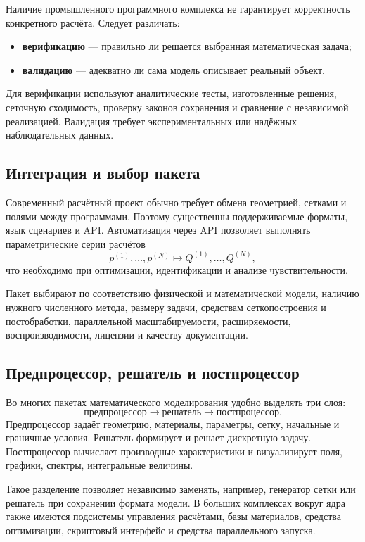Наличие промышленного программного комплекса не гарантирует корректность конкретного расчёта. Следует различать:
\begin{itemize}
\item \textbf{верификацию} --- правильно ли решается выбранная математическая задача;
\item \textbf{валидацию} --- адекватно ли сама модель описывает реальный объект.
\end{itemize}

Для верификации используют аналитические тесты, изготовленные решения, сеточную сходимость, проверку законов сохранения и сравнение с независимой реализацией. Валидация требует экспериментальных или надёжных наблюдательных данных.

\subsection{Интеграция и выбор пакета}

Современный расчётный проект обычно требует обмена геометрией, сетками и полями между программами. Поэтому существенны поддерживаемые форматы, язык сценариев и API. Автоматизация через API позволяет выполнять параметрические серии расчётов
\[
p^{(1)},\ldots,p^{(N)}
\longmapsto
Q^{(1)},\ldots,Q^{(N)},
\]
что необходимо при оптимизации, идентификации и анализе чувствительности.

Пакет выбирают по соответствию физической и математической модели, наличию нужного численного метода, размеру задачи, средствам сеткопостроения и постобработки, параллельной масштабируемости, расширяемости, воспроизводимости, лицензии и качеству документации.


\subsection{Предпроцессор, решатель и постпроцессор}

Во многих пакетах математического моделирования удобно выделять три слоя:
\[
\boxed{\text{предпроцессор}\rightarrow\text{решатель}\rightarrow\text{постпроцессор}}.
\]
Предпроцессор задаёт геометрию, материалы, параметры, сетку, начальные и
граничные условия. Решатель формирует и решает дискретную задачу. Постпроцессор
вычисляет производные характеристики и визуализирует поля, графики, спектры,
интегральные величины.

Такое разделение позволяет независимо заменять, например, генератор сетки или
решатель при сохранении формата модели. В больших комплексах вокруг ядра также
имеются подсистемы управления расчётами, базы материалов, средства оптимизации,
скриптовый интерфейс и средства параллельного запуска.


